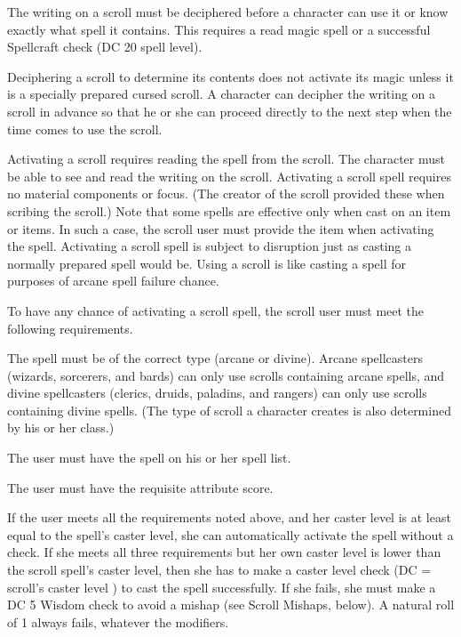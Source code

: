  The writing on a scroll must be deciphered before a character can use it or know exactly what spell it contains. This requires a read magic spell or a successful Spellcraft check (DC 20 \add spell level).

Deciphering a scroll to determine its contents does not activate its magic unless it is a specially prepared cursed scroll. A character can decipher the writing on a scroll in advance so that he or she can proceed directly to the next step when the time comes to use the scroll.

 Activating a scroll requires reading the spell from the scroll. The character must be able to see and read the writing on the scroll. Activating a scroll spell requires no material components or focus. (The creator of the scroll provided these when scribing the scroll.) Note that some spells are effective only when cast on an item or items. In such a case, the scroll user must provide the item when activating the spell. Activating a scroll spell is subject to disruption just as casting a normally prepared spell would be. Using a scroll is like casting a spell for purposes of arcane spell failure chance.

To have any chance of activating a scroll spell, the scroll user must meet the following requirements.
\begin{itemize*}
\item The spell must be of the correct type (arcane or divine). Arcane spellcasters (wizards, sorcerers, and bards) can only use scrolls containing arcane spells, and divine spellcasters (clerics, druids, paladins, and rangers) can only use scrolls containing divine spells. (The type of scroll a character creates is also determined by his or her class.)
\item The user must have the spell on his or her spell list.
\item The user must have the requisite attribute score.
\end{itemize*}

If the user meets all the requirements noted above, and her caster level is at least equal to the spell's caster level, she can automatically activate the spell without a check. If she meets all three requirements but her own caster level is lower than the scroll spell's caster level, then she has to make a caster level check (DC = scroll's caster level ) to cast the spell successfully. If she fails, she must make a DC 5 Wisdom check to avoid a mishap (see Scroll Mishaps, below). A natural roll of 1 always fails, whatever the modifiers.

